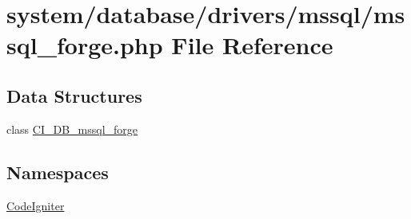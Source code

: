 \hypertarget{mssql__forge_8php}{}\section{system/database/drivers/mssql/mssql\+\_\+forge.php File Reference}
\label{mssql__forge_8php}
\subsection*{Data Structures}
\begin{DoxyCompactItemize}
\item 
class \mbox{\hyperlink{class_c_i___d_b__mssql__forge}{C\+I\+\_\+\+D\+B\+\_\+mssql\+\_\+forge}}
\end{DoxyCompactItemize}
\subsection*{Namespaces}
\begin{DoxyCompactItemize}
\item 
 \mbox{\hyperlink{namespace_code_igniter}{Code\+Igniter}}
\end{DoxyCompactItemize}
